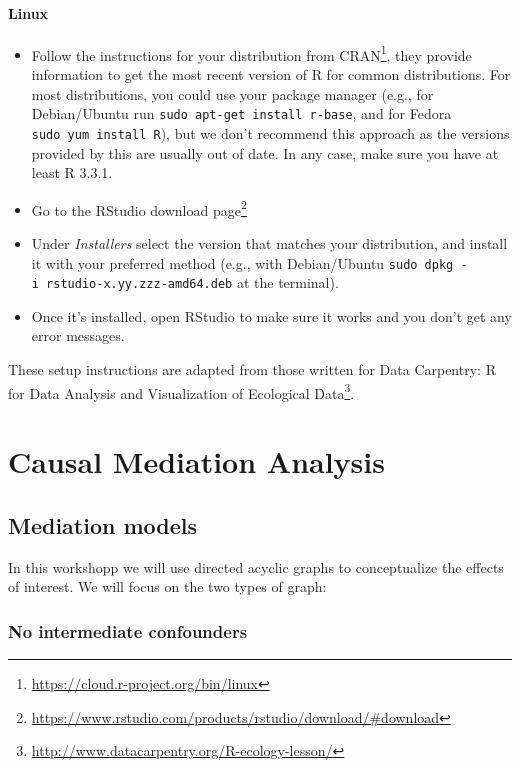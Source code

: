 \documentclass[
  12pt, krantz2,
]{book}
\providecommand{\tightlist}{%
  \setlength{\itemsep}{0pt}\setlength{\parskip}{0pt}}
\renewcommand{\href}[2]{#2\footnote{\url{#1}}}
\theoremstyle{definition}
\theoremstyle{definition}
\theoremstyle{definition}
\newcommand{\1}{\mathbbm{1}}
\begin{document}
\hypertarget{linux}{%
\subsubsection{Linux}\label{linux}}

\begin{itemize}
\tightlist
\item
  Follow the instructions for your distribution
  from \href{https://cloud.r-project.org/bin/linux}{CRAN}, they provide information
  to get the most recent version of R for common distributions. For most
  distributions, you could use your package manager (e.g., for Debian/Ubuntu run
  \texttt{sudo\ apt-get\ install\ r-base}, and for Fedora \texttt{sudo\ yum\ install\ R}), but we
  don't recommend this approach as the versions provided by this are
  usually out of date. In any case, make sure you have at least R 3.3.1.
\item
  Go to the \href{https://www.rstudio.com/products/rstudio/download/\#download}{RStudio download
  page}
\item
  Under \emph{Installers} select the version that matches your distribution, and
  install it with your preferred method (e.g., with Debian/Ubuntu \texttt{sudo\ dpkg\ -i\ rstudio-x.yy.zzz-amd64.deb} at the terminal).
\item
  Once it's installed, open RStudio to make sure it works and you don't get any
  error messages.
\end{itemize}

These setup instructions are adapted from those written for \href{http://www.datacarpentry.org/R-ecology-lesson/}{Data Carpentry: R
for Data Analysis and Visualization of Ecological
Data}.

\hypertarget{mediation}{%
\chapter{Causal Mediation Analysis}\label{mediation}}

\hypertarget{mediation-models}{%
\section{Mediation models}\label{mediation-models}}

In this workshopp we will use directed acyclic graphs to conceptualize
the effects of interest. We will focus on the two types of graph:

\hypertarget{no-intermediate-confounders}{%
\subsection{No intermediate confounders}\label{no-intermediate-confounders}}
\end{document}
